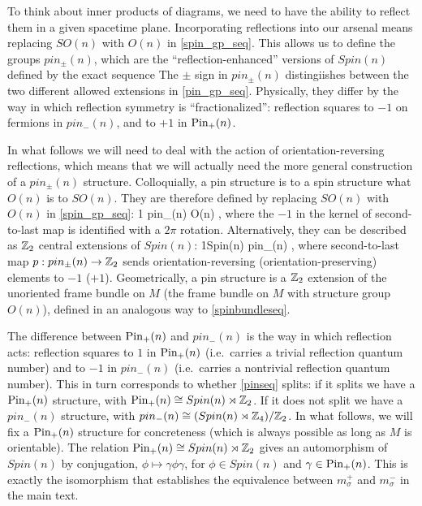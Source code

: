 To think about inner products of diagrams, we need to have the ability to reflect them in a given spacetime plane. Incorporating reflections into our arsenal means replacing $SO(n)$ with $O(n)$ in \eqref{spin_gp_seq}. This allows us to define the groups $pin_\pm(n)$, which are the ``reflection-enhanced'' versions of $Spin(n)$ defined by the exact sequence 
 The $\pm$ sign in $pin_\pm(n)$ distingiishes between the two different allowed extensions in \eqref{pin_gp_seq}. Physically, they differ by the way in which reflection symmetry is ``fractionalized'': reflection squares to $-1$ on fermions in $pin_-(n)$, and to $+1$ in $\text{Pin}_+(n)$. 


In what follows we will need to deal with the action of orientation-reversing reflections, which means that we will actually need the more general construction of a $pin_\pm(n)$ structure. Colloquially, a pin structure is to a spin structure what $O(n)$ is to $SO(n)$. They are therefore defined by replacing $SO(n)$ with $O(n)$ in \eqref{spin_gp_seq}:
\be \label{pin_gp_seq} 1 \ra \zt \ra pin_\pm(n) \ra O(n) ,\ee
where the $-1$ in the kernel of second-to-last map is identified with a $2\pi$ rotation.
Alternatively, they can be described as $\mathbb{Z}_2$ central extensions of $Spin(n)$:
\be \label{pinseq} 1\ra Spin(n) \ra pin_\pm(n) \ra \zt {},\ee 
where second-to-last map $p : pin_\pm(n) \rightarrow \mathbb{Z}_2$ sends orientation-reversing (orientation-preserving) elements to $-1$ ($+1$). Geometrically, a pin structure is a $\mathbb{Z}_2$ extension of the unoriented frame bundle on $M$ (the frame bundle on $M$ with structure group $O(n)$), defined in an analogous way to \eqref{spinbundleseq}.

The difference between $\text{Pin}_+(n)$ and $pin_-(n)$ is the way in which reflection acts: 
reflection squares to $1$ in $\text{Pin}_+(n)$ (i.e.\ carries a trivial reflection quantum number) 
and to $-1$ in $pin_-(n)$ (i.e.\ carries a nontrivial reflection quantum number). 
This in turn corresponds to whether \eqref{pinseq} splits: if it splits we have a $\text{Pin}_+(n)$ structure, 
with $\text{Pin}_+(n) \cong Spin(n) \rtimes \mathbb{Z}_2$. If it does not split we have a $pin_-(n)$ structure, 
with $pin_-(n) \cong (Spin(n) \rtimes \mathbb{Z}_4)/\mathbb{Z}_2$. In what follows, we will fix a $\text{Pin}_+(n)$ 
structure for concreteness (which is always possible as long as $M$ is orientable). 
The relation $\text{Pin}_+(n) \cong Spin(n) \rtimes \mathbb{Z}_2$ gives an automorphism of $Spin(n)$ by 
conjugation, $\phi \mapsto \gamma \phi \gamma$, for $\phi \in Spin(n)$ and $\gamma \in \text{Pin}_+(n)$. 
This is exactly the isomorphism that establishes the equivalence between $m_\sigma^+$ 
and $m_\sigma^-$ in the main text. 

